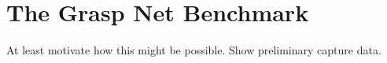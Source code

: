 \section{The Grasp Net Benchmark}   

At least motivate how this might be possible.   Show preliminary capture data.
